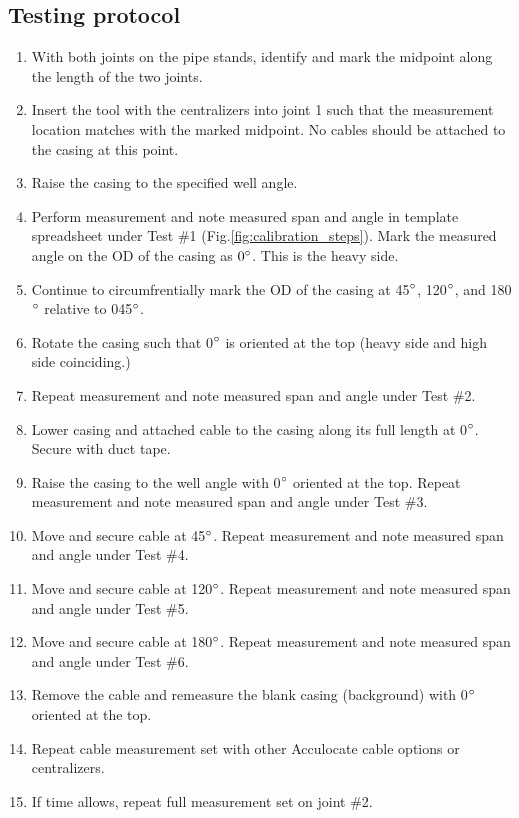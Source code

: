 \documentclass[paper=a4, fontsize=11pt]{scrartcl}
\numberwithin{equation}{section}		%
\numberwithin{figure}{section}			%
\numberwithin{table}{section}				%
\begin{document}
\subsection{Testing protocol}
\begin{enumerate}
    \item With both joints on the pipe stands, identify and mark the midpoint along the length of the two joints.
    \item Insert the tool with the centralizers into joint 1 such that the measurement location matches with the marked midpoint.  No cables should be attached to the casing at this point.
    \item Raise the casing to the specified well angle.
    \item Perform measurement and note measured span and angle in template spreadsheet under Test {\#}1 (Fig.\ref{fig:calibration_steps}).  Mark the measured angle on the OD of the casing as $0\degree$.  This is the heavy side.  
    \item Continue to circumfrentially mark the OD of the casing at 45$\degree$, 120$\degree$, and 180$\degree$ relative to 045$\degree$.
    \item Rotate the casing such that 0$\degree$ is oriented at the top (heavy side and high side coinciding.)
    \item Repeat measurement and note measured span and angle under Test {\#}2.
    \item Lower casing and attached cable to the casing along its full length  at 0$\degree$.  Secure with duct tape.
    \item Raise the casing to the well angle with 0$\degree$ oriented at the top. Repeat measurement and note measured span and angle under Test {\#}3.
    \item Move and secure cable at 45$\degree$.  Repeat measurement and note measured span and angle under Test {\#}4.
    \item Move and secure cable at 120$\degree$.  Repeat measurement and note measured span and angle under Test {\#}5.
    \item Move and secure cable at 180$\degree$.  Repeat measurement and note measured span and angle under Test {\#}6.
    \item Remove the cable and remeasure the blank casing (background) with 0$\degree$ oriented at the top.
    \item Repeat cable measurement set with other Acculocate cable options or centralizers.
    \item If time allows, repeat full measurement set on joint \#2.
\end{enumerate}
\end{document}
